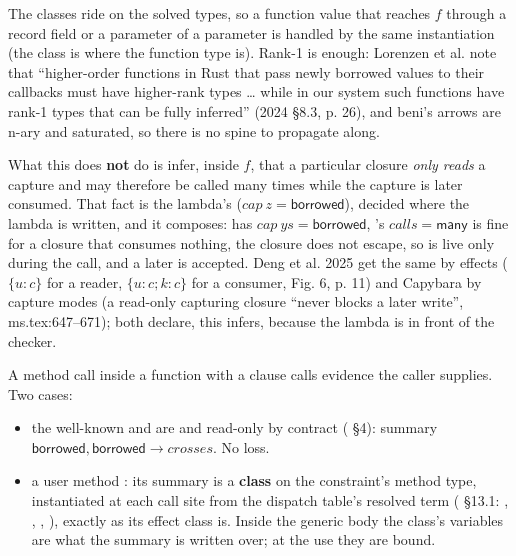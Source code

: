 The classes ride on the solved types, so a function value that reaches $f$ through a record field or a parameter of a parameter is handled by the same instantiation (the class is where the function type is). Rank-1 is enough: Lorenzen et al. note that “higher-order functions in Rust that pass newly borrowed values to their callbacks must have higher-rank types … while in our system such functions have rank-1 types that can be fully inferred” (2024 §8.3, p. 26), and beni's arrows are n-ary and saturated, so there is no spine to propagate along.

What this does \textbf{not} do is infer, inside $f$, that a particular closure \emph{only reads} a capture and may therefore be called many times while the capture is later consumed. That fact is the lambda's ($\mathit{cap}\ z=\mathsf{borrowed}$), decided where the lambda is written, and it composes:  has $\mathit{cap}\ \mathit{ys}=\mathsf{borrowed}$, 's $\mathit{calls}=\mathsf{many}$ is fine for a closure that consumes nothing, the closure does not escape, so  is live only during the  call, and a later  is accepted. Deng et al. 2025 get the same by effects ($\{u:c\}$ for a reader, $\{u:c;k:c\}$ for a consumer, Fig. 6, p. 11) and Capybara by capture modes (a read-only capturing closure “never blocks a later write”, ms.tex:647–671); both declare, this infers, because the lambda is in front of the checker.


A method call  inside a function with a  clause calls evidence the caller supplies. Two cases:

\begin{itemize}
\item the well-known  and  are  and read-only by contract ( §4): summary $\mathsf{borrowed},\allowbreak{}\mathsf{borrowed}\to \mathit{crosses}$. No loss.
\item a user method : its summary is a \textbf{class} on the constraint's method type, instantiated at each call site from the dispatch table's resolved term ( §13.1: , , , ), exactly as its effect class is. Inside the generic body the class's variables are what the summary is written over; at the use they are bound.
\end{itemize}

